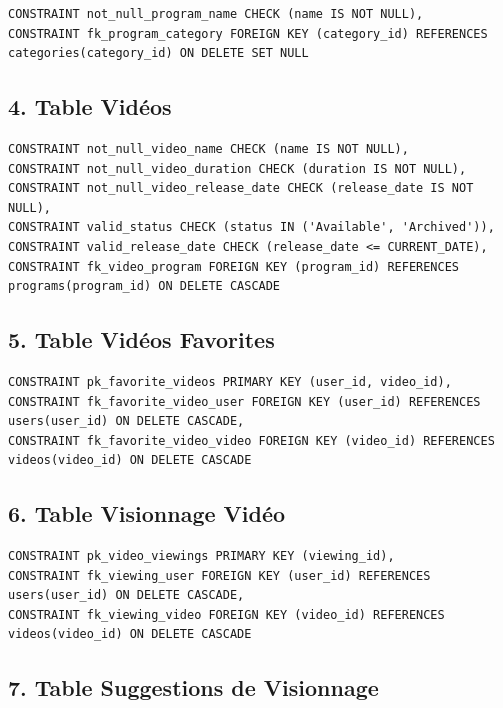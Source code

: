 \documentclass[a4paper, 12pt]{article}
\begin{document}
\begin{lstlisting}
CONSTRAINT not_null_program_name CHECK (name IS NOT NULL),
CONSTRAINT fk_program_category FOREIGN KEY (category_id) REFERENCES categories(category_id) ON DELETE SET NULL
\end{lstlisting}

\subsection*{4. Table Vidéos}

\begin{lstlisting}
CONSTRAINT not_null_video_name CHECK (name IS NOT NULL),
CONSTRAINT not_null_video_duration CHECK (duration IS NOT NULL),
CONSTRAINT not_null_video_release_date CHECK (release_date IS NOT NULL),
CONSTRAINT valid_status CHECK (status IN ('Available', 'Archived')),
CONSTRAINT valid_release_date CHECK (release_date <= CURRENT_DATE),
CONSTRAINT fk_video_program FOREIGN KEY (program_id) REFERENCES programs(program_id) ON DELETE CASCADE
\end{lstlisting}

\subsection*{5. Table Vidéos Favorites}

\begin{lstlisting}
CONSTRAINT pk_favorite_videos PRIMARY KEY (user_id, video_id),
CONSTRAINT fk_favorite_video_user FOREIGN KEY (user_id) REFERENCES users(user_id) ON DELETE CASCADE,
CONSTRAINT fk_favorite_video_video FOREIGN KEY (video_id) REFERENCES videos(video_id) ON DELETE CASCADE
\end{lstlisting}

\subsection*{6. Table Visionnage Vidéo}

\begin{lstlisting}
CONSTRAINT pk_video_viewings PRIMARY KEY (viewing_id),
CONSTRAINT fk_viewing_user FOREIGN KEY (user_id) REFERENCES users(user_id) ON DELETE CASCADE,
CONSTRAINT fk_viewing_video FOREIGN KEY (video_id) REFERENCES videos(video_id) ON DELETE CASCADE
\end{lstlisting}

\subsection*{7. Table Suggestions de Visionnage}
\end{document}

